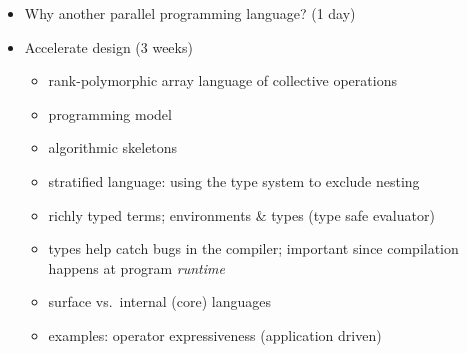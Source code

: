 \begin{itemize}
\item Why another parallel programming language? (1 day)

\item Accelerate design (3 weeks)
    \begin{itemize}
        \item rank-polymorphic array language of collective operations
        \item programming model
        \item algorithmic skeletons
        \item stratified language: using the type system to exclude nesting
        \item richly typed terms; environments \& types (type safe evaluator)
        \item types help catch bugs in the compiler; important since
            compilation happens at program \emph{runtime}
        \item surface vs.\ internal (core) languages
        \item examples: operator expressiveness (application driven)
    \end{itemize}

\end{itemize}



